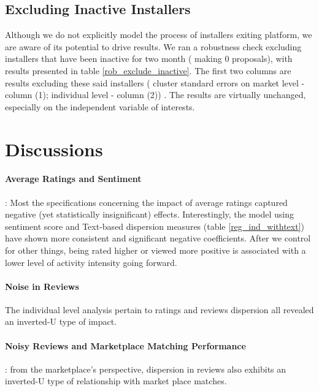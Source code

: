 \documentclass[msom,blindrev]{informs3}
\begin{document}
\subsection{Excluding Inactive Installers}
Although we do not explicitly model the process of installers exiting platform, we are aware of its potential to drive results. We ran a robustness check excluding installers that have been inactive for two month ( making 0 proposals), with results presented in table \ref{rob_exclude_inactive}. The first two columns are results excluding these said installers ( cluster standard errors on market level - column (1); individual level - column (2)) . The results are virtually unchanged, especially on the independent variable of interests.


\section{Discussions}

\paragraph{Average Ratings and Sentiment} : Most the specifications concerning the impact of average ratings captured negative (yet statistically insignificant) effects.  Interestingly, the model using sentiment score and Text-based dispersion measures (table \ref{reg_ind_withtext}) have shown more consistent and significant negative coefficients. After we control for other things, being rated higher or viewed more positive is associated with a lower level of activity intensity going forward. \\

\paragraph{Noise in Reviews} The individual level analysis pertain to ratings and reviews dispersion all revealed an inverted-U type of impact.

\paragraph{Noisy Reviews and Marketplace Matching Performance}: from the marketplace's perspective, dispersion in reviews also exhibits an inverted-U type of relationship with market place matches.
\end{document}

